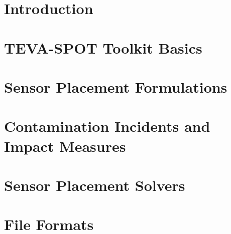 \chapter{Introduction}

\newpage
\chapter{TEVA-SPOT Toolkit Basics}

\clearpage
\chapter{Sensor Placement Formulations}

\clearpage
\chapter{Contamination Incidents and Impact Measures}

\clearpage
\chapter{Sensor Placement Solvers}

\clearpage
\chapter{File Formats}


